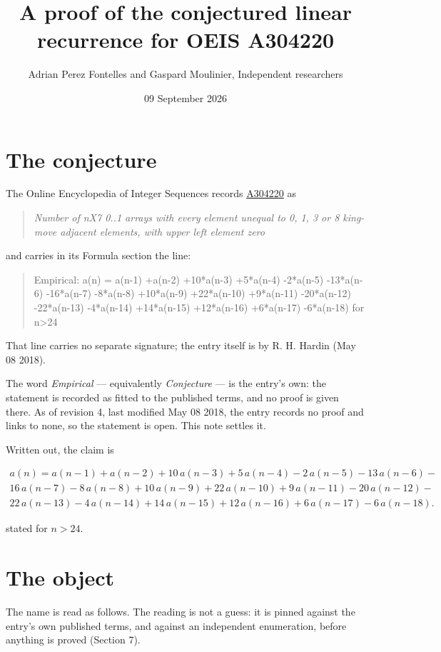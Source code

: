 \documentclass[11pt]{article}
\title{A proof of the conjectured linear recurrence for OEIS A304220}
\author{Adrian Perez Fontelles and Gaspard Moulinier, Independent researchers}
\date{09 September 2026}
\theoremstyle{definition}
\begin{document}
\maketitle
\section{The conjecture}

The Online Encyclopedia of Integer Sequences records \href{https://oeis.org/A304220}{A304220} as

\begin{quote}\itshape Number of nX7 0..1 arrays with every element unequal to 0, 1, 3 or 8 king-move adjacent elements, with upper left element zero\end{quote}

and carries in its Formula section the line:

\begin{quote}\ttfamily Empirical: a(n) = a(n-1) +a(n-2) +10*a(n-3) +5*a(n-4) -2*a(n-5) -13*a(n-6) -16*a(n-7) -8*a(n-8) +10*a(n-9) +22*a(n-10) +9*a(n-11) -20*a(n-12) -22*a(n-13) -4*a(n-14) +14*a(n-15) +12*a(n-16) +6*a(n-17) -6*a(n-18) for n>24\end{quote}

That line carries no separate signature; the entry itself is by R. H. Hardin (May 08 2018).

The word {\itshape Empirical} --- equivalently {\itshape Conjecture} --- is the entry's own: the statement is recorded as fitted to the published terms, and no proof is given there. As of revision 4, last modified May 08 2018, the entry records no proof and links to none, so the statement is open. This note settles it.

Written out, the claim is

\begin{multline*} a(n) = a(n-1) + a(n-2) + 10\,a(n-3) + 5\,a(n-4) - 2\,a(n-5) - 13\,a(n-6) - \\ 16\,a(n-7) - 8\,a(n-8) + 10\,a(n-9) + 22\,a(n-10) + 9\,a(n-11) - 20\,a(n-12) - \\ 22\,a(n-13) - 4\,a(n-14) + 14\,a(n-15) + 12\,a(n-16) + 6\,a(n-17) - 6\,a(n-18). \end{multline*}

stated for $n > 24$.

\section{The object}

The name is read as follows. The reading is not a guess: it is pinned against the entry's own published terms, and against an independent enumeration, before anything is proved (Section 7).
\end{document}
